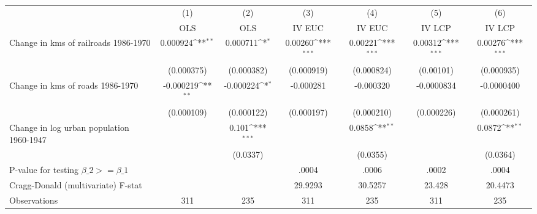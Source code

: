 {
\def\sym#1{\ifmmode^{#1}\else\(^{#1}\)\fi}
\begin{tabular}{l*{6}{c}}
\hline\hline
                &\multicolumn{1}{c}{(1)}&\multicolumn{1}{c}{(2)}&\multicolumn{1}{c}{(3)}&\multicolumn{1}{c}{(4)}&\multicolumn{1}{c}{(5)}&\multicolumn{1}{c}{(6)}\\
                &\multicolumn{1}{c}{OLS}&\multicolumn{1}{c}{OLS}&\multicolumn{1}{c}{IV EUC}&\multicolumn{1}{c}{IV EUC}&\multicolumn{1}{c}{IV LCP}&\multicolumn{1}{c}{IV LCP}\\
\hline
Change in kms of railroads 1986-1970& 0.000924\sym{**} & 0.000711\sym{*}  &  0.00260\sym{***}&  0.00221\sym{***}&  0.00312\sym{***}&  0.00276\sym{***}\\
                &(0.000375)         &(0.000382)         &(0.000919)         &(0.000824)         &(0.00101)         &(0.000935)         \\
[1em]
Change in kms of roads 1986-1970&-0.000219\sym{**} &-0.000224\sym{*}  &-0.000281         &-0.000320         &-0.0000834         &-0.0000400         \\
                &(0.000109)         &(0.000122)         &(0.000197)         &(0.000210)         &(0.000226)         &(0.000261)         \\
[1em]
Change in log urban population 1960-1947&                  &    0.101\sym{***}&                  &   0.0858\sym{**} &                  &   0.0872\sym{**} \\
                &                  & (0.0337)         &                  & (0.0355)         &                  & (0.0364)         \\
\hline
P-value for testing $\beta\_{2} >= \beta\_{1}$&                  &                  &    .0004         &    .0006         &    .0002         &    .0004         \\
Cragg-Donald (multivariate) F-stat&                  &                  &  29.9293         &  30.5257         &   23.428         &  20.4473         \\
Observations    &      311         &      235         &      311         &      235         &      311         &      235         \\
\hline\hline
\end{tabular}
}
